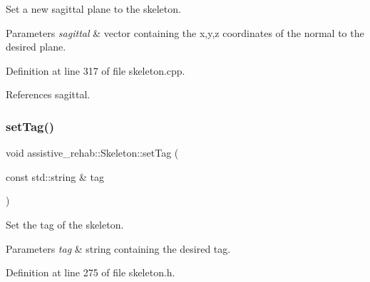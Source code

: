 Set a new sagittal plane to the skeleton. 


\begin{DoxyParams}{Parameters}
{\em sagittal} & vector containing the x,y,z coordinates of the normal to the desired plane. \\
\hline
\end{DoxyParams}


Definition at line 317 of file skeleton.\+cpp.


\begin{DoxyCode}{0}

\end{DoxyCode}


References sagittal.

\mbox{\label{classassistive__rehab_1_1Skeleton_ae1c830e3d9a0ba692e5ae297caa52a82}} 
\subsubsection{\texorpdfstring{setTag()}{setTag()}}
{\footnotesize\ttfamily void assistive\+\_\+rehab\+::\+Skeleton\+::set\+Tag (\begin{DoxyParamCaption}\item[{const std\+::string \&}]{tag }\end{DoxyParamCaption})\hspace{0.3cm}{\ttfamily [inline]}}



Set the tag of the skeleton. 


\begin{DoxyParams}{Parameters}
{\em tag} & string containing the desired tag. \\
\hline
\end{DoxyParams}


Definition at line 275 of file skeleton.\+h.


\begin{DoxyCode}{0}

\end{DoxyCode}



